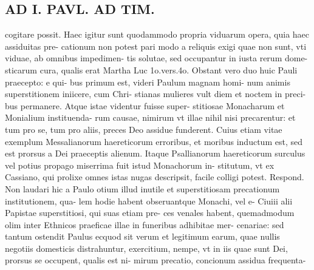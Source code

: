 \documentclass{article}
\begin{document}
\begin{pages}
\section*{AD I. PAVL. AD TIM. }
\marginpar{[ p.260 ]}\pstart cogitare possit. Haec igitur sunt quodammodo propria viduarum opera, quia haec assiduitas pre- cationum non potest pari modo a reliquis exigi quae non sunt, vti viduae, ab omnibus impedimen- tis solutae, sed occupantur in iusta rerum dome- sticarum cura, qualis erat Martha Luc 1o.vers.4o. Obstant vero duo huic Pauli praecepto: e qui- bus primum est, videri Paulum magnam homi- num animis superstitionem iniicere, cum Chri- stianas mulieres vult diem et noctem in preci- bus permanere. Atque istae videntur fuisse super- stitiosae Monacharum et Monialium instituenda- rum causae, nimirum vt illae nihil nisi precarentur: et tum pro se, tum pro aliis, preces Deo assidue funderent. Cuius etiam vitae exemplum Messalianorum haereticorum erroribus, et moribus inductum est, sed est prorsus a Dei praeceptis alienum. Itaque Psallianorum haereticorum surculus vel potius propago miserrima fuit istud Monachorum in- stitutum, vt ex Cassiano, qui prolixe omnes istas nugas descripsit, facile colligi potest. Respond. Non laudari hic a Paulo otium illud inutile et superstitiosam precationum institutionem, qua- lem hodie habent obseruantque Monachi, vel e- Ciuiii alii Papistae superstitiosi, qui suas etiam pre- ces venales habent, quemadmodum olim inter Ethnicos praeficae illae in funeribus adhibitae mer- cenariae: sed tantum ostendit Paulus ecquod sit verum et legitimum earum, quae nullis negotiis domesticis distrahuntur, exercitium, nempe, vt in iis quae sunt Dei, prorsus se occupent, qualis est ni- mirum precatio, concionum assidua frequenta-  \pend

\end{pages}
\end{document}
